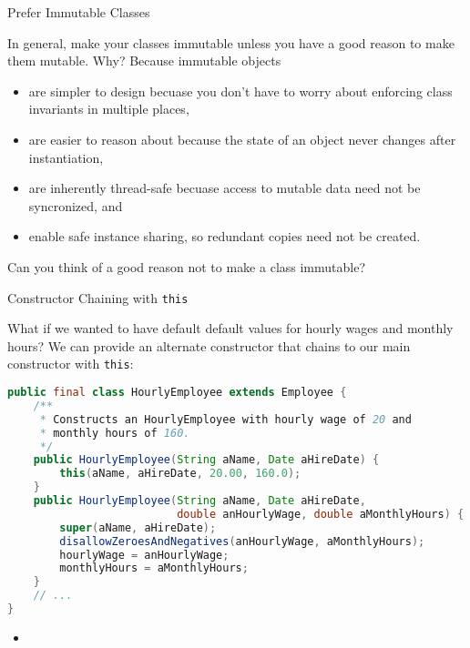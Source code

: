 \documentclass{beamer}
\begin{document}
\begin{frame}[fragile]{Prefer Immutable Classes}


In general, make your classes immutable unless you have a good reason to make them mutable.  Why?  Because immutable objects
\begin{itemize}
\item are simpler to design becuase you don't have to worry about enforcing class invariants in multiple places,
\item are easier to reason about because the state of an object never changes after instantiation,
\item are inherently thread-safe becuase access to mutable data need not be syncronized, and
\item enable safe instance sharing, so redundant copies need not be created.
\end{itemize}

Can you think of a good reason not to make a class immutable?

\end{frame}

\begin{frame}[fragile]{Constructor Chaining with {\tt this}}


What if we wanted to have default default values for hourly wages and monthly hours?  We can provide an alternate constructor that chains to our main constructor with {\tt this}:
\begin{lstlisting}[language=Java]
public final class HourlyEmployee extends Employee {
    /**
     * Constructs an HourlyEmployee with hourly wage of 20 and 
     * monthly hours of 160.
     */
    public HourlyEmployee(String aName, Date aHireDate) {
        this(aName, aHireDate, 20.00, 160.0);
    }
    public HourlyEmployee(String aName, Date aHireDate,
                          double anHourlyWage, double aMonthlyHours) {
        super(aName, aHireDate);
        disallowZeroesAndNegatives(anHourlyWage, aMonthlyHours);
        hourlyWage = anHourlyWage;
        monthlyHours = aMonthlyHours;
    }
    // ...
}
\end{lstlisting}

\begin{itemize}
\item
\end{itemize}


\end{frame}
\end{document}
